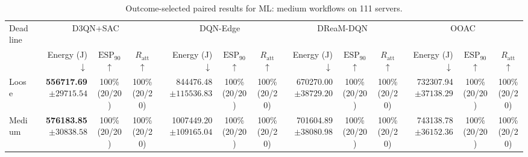 \begin{table}[!t]
\centering
\caption{Outcome-selected paired results for ML: medium workflows on 111 servers.}
\label{tab:conditional_case_ml}
\begingroup
\footnotesize
\setlength{\tabcolsep}{2.2pt}
\renewcommand{\arraystretch}{1.08}
\begin{tabular}{@{}l*{4}{rcc}@{}}
\toprule
Deadline & \multicolumn{3}{c}{D3QN+SAC} & \multicolumn{3}{c}{DQN-Edge} & \multicolumn{3}{c}{DReaM-DQN} & \multicolumn{3}{c}{OOAC} \\
\cmidrule(lr){2-4}\cmidrule(lr){5-7}\cmidrule(lr){8-10}\cmidrule(lr){11-13}
 & Energy (J) $\downarrow$ & $\mathrm{ESP}_{90}$ $\uparrow$ & $R_{\mathrm{att}}$ $\uparrow$ & Energy (J) $\downarrow$ & $\mathrm{ESP}_{90}$ $\uparrow$ & $R_{\mathrm{att}}$ $\uparrow$ & Energy (J) $\downarrow$ & $\mathrm{ESP}_{90}$ $\uparrow$ & $R_{\mathrm{att}}$ $\uparrow$ & Energy (J) $\downarrow$ & $\mathrm{ESP}_{90}$ $\uparrow$ & $R_{\mathrm{att}}$ $\uparrow$ \\
\midrule
Loose & \shortstack[r]{\textbf{556717.69}\\$\pm 29715.54$} & \shortstack[c]{100\%\\(20/20)} & \shortstack[c]{100\%\\(20/20)} & \shortstack[r]{844476.48\\$\pm 115536.83$} & \shortstack[c]{100\%\\(20/20)} & \shortstack[c]{100\%\\(20/20)} & \shortstack[r]{670270.00\\$\pm 38729.20$} & \shortstack[c]{100\%\\(20/20)} & \shortstack[c]{100\%\\(20/20)} & \shortstack[r]{732307.94\\$\pm 37138.29$} & \shortstack[c]{100\%\\(20/20)} & \shortstack[c]{100\%\\(20/20)} \\
Medium & \shortstack[r]{\textbf{576183.85}\\$\pm 30838.58$} & \shortstack[c]{100\%\\(20/20)} & \shortstack[c]{100\%\\(20/20)} & \shortstack[r]{1007449.20\\$\pm 109165.04$} & \shortstack[c]{100\%\\(20/20)} & \shortstack[c]{100\%\\(20/20)} & \shortstack[r]{701604.89\\$\pm 38080.98$} & \shortstack[c]{100\%\\(20/20)} & \shortstack[c]{100\%\\(20/20)} & \shortstack[r]{743138.78\\$\pm 36152.36$} & \shortstack[c]{100\%\\(20/20)} & \shortstack[c]{100\%\\(20/20)} \\

\end{tabular}
\end{table}
